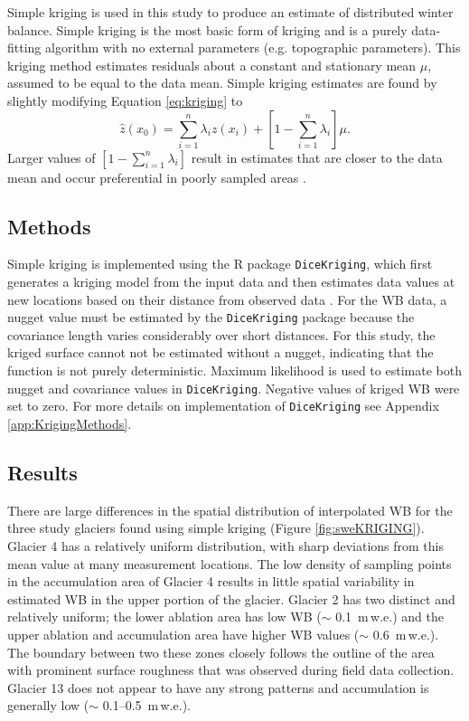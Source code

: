 \documentclass{sfuthesis}
\begin{document}
{Simple kriging is used in this study to produce an estimate of distributed winter balance. Simple kriging is the most basic form of kriging and is a purely data-fitting algorithm with no external parameters (e.g. topographic parameters). This kriging method estimates residuals about a constant and stationary mean $\mu$, assumed to be equal to the data mean. Simple kriging estimates are found by slightly modifying Equation \ref{eq:kriging} to 
\begin{equation}
\hat{z}(x_0) = \sum_{i=1}^{n} \lambda_i z(x_i) +\left[1-\sum_{i=1}^{n} \lambda_i \right]\mu.
\end{equation}
Larger values of $\left[1-\sum_{i=1}^{n} \lambda_i \right]$ result in estimates that are closer to the data mean and occur preferential in poorly sampled areas \citep{Li2008}.

\subsection{Methods}
\label{sec:kriging_methods}

Simple kriging is implemented using the R package \texttt{DiceKriging}, which first generates a kriging model from the input data and then estimates data values at new locations based on their distance from observed data \citep{Roustant2012}. For the WB data, a nugget value must be estimated by the \texttt{DiceKriging} package because the covariance length varies considerably over short distances. For this study, the kriged surface cannot not be estimated without a nugget, indicating that the function is not purely deterministic. Maximum likelihood is used to estimate both nugget and covariance values in \texttt{DiceKriging}. Negative values of kriged WB were set to zero. For more details on implementation of \texttt{DiceKriging} see Appendix \ref{app:KrigingMethods}.

\subsection{Results}

There are large differences in the spatial distribution of interpolated WB for the three study glaciers found using simple kriging (Figure \ref{fig:sweKRIGING}). Glacier 4 has a relatively uniform distribution, with sharp deviations from this mean value at many measurement locations. The low density of sampling points in the accumulation area of Glacier 4 results in little spatial variability in estimated WB in the upper portion of the glacier. Glacier 2 has two distinct and relatively uniform; the lower ablation area has low WB ($\sim$ 0.1 \,m\,w.e.) and the upper ablation and accumulation area have higher WB values ($\sim$ 0.6 \,m\,w.e.). The boundary between two these zones closely follows the outline of the area with prominent surface roughness that was observed during field data collection. Glacier 13 does not appear to have any strong patterns and accumulation is generally low ($\sim$ 0.1--0.5 \,m\,w.e.). 

}
\end{document}
